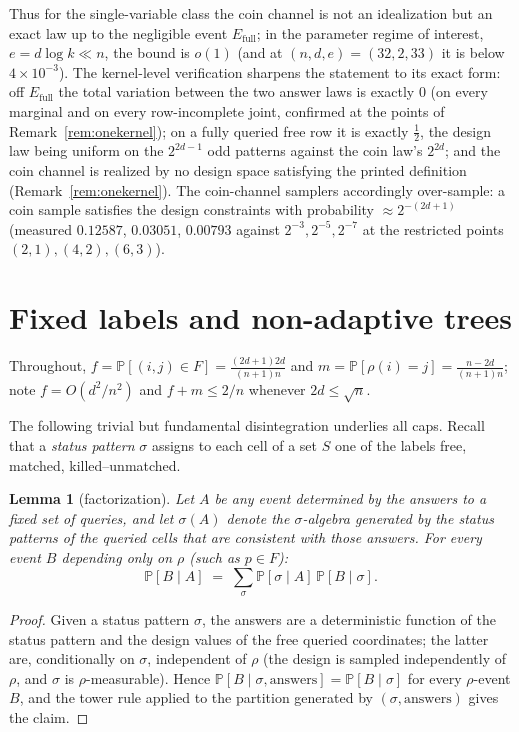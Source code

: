 \documentclass[11pt]{article}
\newtheorem{lemma}[theorem]{Lemma}
\theoremstyle{definition}
\theoremstyle{remark}
\newcommand{\Prob}{\mathbb{P}}
\begin{document}
Thus for the single-variable class the coin channel is not an
idealization but an exact law up to the negligible event
$E_{\mathrm{full}}$; in the parameter regime of interest,
$e=d\log k\ll n$, the bound is $o(1)$ (and at $(n,d,e)=(32,2,33)$ it is
below $4\times10^{-3}$).  The kernel-level verification sharpens the
statement to its exact form: off $E_{\mathrm{full}}$ the total
variation between the two answer laws is exactly $0$ (on every
marginal and on every row-incomplete joint, confirmed at the points of
Remark~\ref{rem:onekernel}); on a fully queried free row it is exactly
$\tfrac12$, the design law being uniform on the $2^{2d-1}$ odd
patterns against the coin law's $2^{2d}$; and the coin channel is
realized by no design space satisfying the printed definition
(Remark~\ref{rem:onekernel}).  The coin-channel samplers accordingly
over-sample: a coin sample satisfies the design constraints with
probability $\approx2^{-(2d+1)}$ (measured $0.12587$, $0.03051$,
$0.00793$ against $2^{-3},2^{-5},2^{-7}$ at the restricted points
$(2,1),(4,2),(6,3)$).

\section{Fixed labels and non-adaptive trees}\label{sec:nonadaptive}

Throughout, $f=\Prob[(i,j)\in F]=\frac{(2d+1)2d}{(n+1)n}$ and
$m=\Prob[\rho(i)=j]=\frac{n-2d}{(n+1)n}$; note $f=O(d^2/n^2)$ and
$f+m\le 2/n$ whenever $2d\le\sqrt{n}$.

The following trivial but fundamental disintegration underlies all caps.
Recall that a \emph{status pattern} $\sigma$ assigns to each cell of a
set $S$ one of the labels free, matched, killed--unmatched.

\begin{lemma}[factorization]\label{lem:factor}
Let $A$ be any event determined by the answers to a fixed set of queries,
and let $\sigma(A)$ denote the $\sigma$-algebra generated by the status
patterns of the queried cells that are consistent with those answers.
For every event $B$ depending only on $\rho$ (such as $p\in F$):
\[
\Prob[B\mid A]\;=\;\sum_{\sigma}\Prob[\sigma\mid A]\,
\Prob[B\mid\sigma] .
\]
\end{lemma}

\begin{proof}
Given a status pattern $\sigma$, the answers are a deterministic function
of the status pattern and the design values of the free queried
coordinates; the latter are, conditionally on $\sigma$, independent of
$\rho$ (the design is sampled independently of $\rho$, and $\sigma$ is
$\rho$-measurable).  Hence $\Prob[B\mid\sigma,\text{answers}]
=\Prob[B\mid\sigma]$ for every $\rho$-event $B$, and the tower rule
applied to the partition generated by $(\sigma,\text{answers})$ gives
the claim.
\end{proof}
\end{document}
